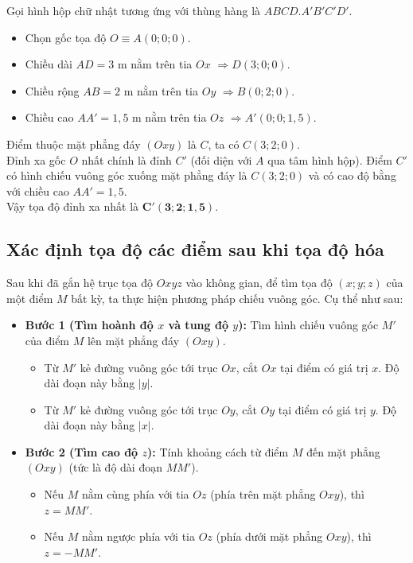\documentclass[12pt]{article}
\begin{document}
	\begin{loigiai}
		Gọi hình hộp chữ nhật tương ứng với thùng hàng là $ABCD.A'B'C'D'$.
		\begin{itemize}
			\item Chọn gốc tọa độ $O \equiv A(0; 0; 0)$.
			\item Chiều dài $AD = 3$ m nằm trên tia $Ox$ $\Rightarrow D(3; 0; 0)$.
			\item Chiều rộng $AB = 2$ m nằm trên tia $Oy$ $\Rightarrow B(0; 2; 0)$.
			\item Chiều cao $AA' = 1,5$ m nằm trên tia $Oz$ $\Rightarrow A'(0; 0; 1,5)$.
		\end{itemize}
		Điểm thuộc mặt phẳng đáy $(Oxy)$ là $C$, ta có $C(3; 2; 0)$. \\
		Đỉnh xa gốc $O$ nhất chính là đỉnh $C'$ (đối diện với $A$ qua tâm hình hộp). Điểm $C'$ có hình chiếu vuông góc xuống mặt phẳng đáy là $C(3;2;0)$ và có cao độ bằng với chiều cao $AA' = 1,5$. \\
		Vậy tọa độ đỉnh xa nhất là $\mathbf{C'(3; 2; 1,5)}$.
	\end{loigiai}
	
	
	\subsection{Xác định tọa độ các điểm sau khi tọa độ hóa}
	
	Sau khi đã gắn hệ trục tọa độ $Oxyz$ vào không gian, để tìm tọa độ $(x; y; z)$ của một điểm $M$ bất kỳ, ta thực hiện phương pháp chiếu vuông góc. Cụ thể như sau:
	
	\begin{itemize}
		\item \textbf{Bước 1 (Tìm hoành độ $x$ và tung độ $y$):} Tìm hình chiếu vuông góc $M'$ của điểm $M$ lên mặt phẳng đáy $(Oxy)$. 
		\begin{itemize}
			\item Từ $M'$ kẻ đường vuông góc tới trục $Ox$, cắt $Ox$ tại điểm có giá trị $x$. Độ dài đoạn này bằng $|y|$.
			\item Từ $M'$ kẻ đường vuông góc tới trục $Oy$, cắt $Oy$ tại điểm có giá trị $y$. Độ dài đoạn này bằng $|x|$.
		\end{itemize}
		\item \textbf{Bước 2 (Tìm cao độ $z$):} Tính khoảng cách từ điểm $M$ đến mặt phẳng $(Oxy)$ (tức là độ dài đoạn $MM'$).
		\begin{itemize}
			\item Nếu $M$ nằm cùng phía với tia $Oz$ (phía trên mặt phẳng $Oxy$), thì $z = MM'$.
			\item Nếu $M$ nằm ngược phía với tia $Oz$ (phía dưới mặt phẳng $Oxy$), thì $z = -MM'$.
		\end{itemize}
	\end{itemize}
	
\end{document}
